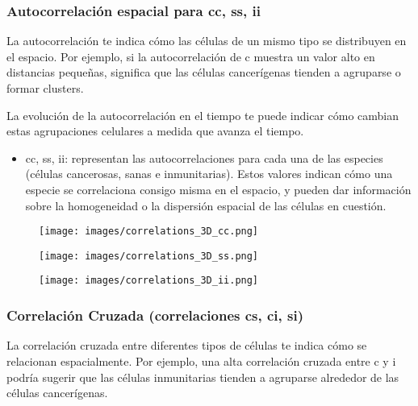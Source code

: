 \documentclass{article}
\begin{document}
\subsubsection{Autocorrelación espacial para cc, ss, ii} 

La autocorrelación te indica cómo las células de un mismo tipo se distribuyen en el espacio. Por ejemplo, si la autocorrelación de c muestra un valor alto en distancias pequeñas, significa que las células cancerígenas tienden a agruparse o formar clusters.

La evolución de la autocorrelación en el tiempo te puede indicar cómo cambian estas agrupaciones celulares a medida que avanza el tiempo.

\begin{itemize}
    \item cc, ss, ii: representan las autocorrelaciones para cada una de las especies (células cancerosas, sanas e inmunitarias). Estos valores indican cómo una especie se correlaciona consigo misma en el espacio, y pueden dar información sobre la homogeneidad o la dispersión espacial de las células en cuestión.
\end{itemize}


\begin{figure}[htbp]
    \centering
    \texttt{[image: images/correlations\_3D\_cc.png]}
    \caption{}
\end{figure}

\begin{figure}[htbp]
    \centering
    \texttt{[image: images/correlations\_3D\_ss.png]}
    \caption{}
\end{figure}


\begin{figure}[htbp]
    \centering
    \texttt{[image: images/correlations\_3D\_ii.png]}
    \caption{}
\end{figure}



\subsubsection{Correlación Cruzada (correlaciones cs, ci, si)}

La correlación cruzada entre diferentes tipos de células te indica cómo se relacionan espacialmente. Por ejemplo, una alta correlación cruzada entre c y i podría sugerir que las células inmunitarias tienden a agruparse alrededor de las células cancerígenas.
\end{document}
